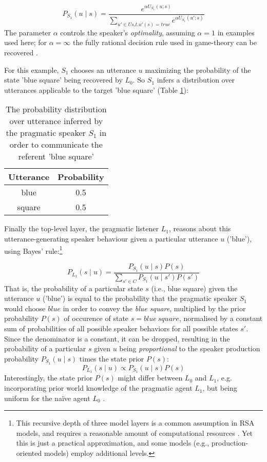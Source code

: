 $$P_{S_1}(u \mid s) = \frac{e^{\alpha U_{S_1} (u; s)}}{\sum_{u' \in U s.t. u'(s) = true} e^{\alpha U_{S_1} (u'; s)}}$$
The parameter $\alpha$ controls the speaker's \emph{optimality}, assuming $\alpha = 1$ in examples used here; for $\alpha = \infty $ the fully rational decision rule used in game-theory can be recovered \parencite{problang, lassiter2017adjectival}.

For this example, $S_1$ chooses an utterance $u$ maximizing the probability of the state 'blue square' being recovered by $L_0$. So $S_1$ infers a distribution over utterances applicable to the target 'blue square' (Table \ref{rsa-s1}):

\begin{table}[h]
	\begin{center}
		\caption{The probability distribution over utterance inferred by the pragmatic speaker $S_1$ in order to communicate the referent 'blue square'}
		\label{rsa-s1}
		\vskip 0.12in
		\begin{tabular}{cc}
			Utterance & Probability \\
			\hline
			blue & 0.5 \\
			square & 0.5
		\end{tabular}
	\end{center}
\end{table}
 
Finally the top-level layer, the pragmatic listener $L_1$, reasons about this utterance-generating speaker behaviour given a particular utterance $u$ ('blue'), using Bayes' rule:\footnote{This recursive depth of three model layers is a common assumption in RSA models, and requires a reasonable amount of computational resources \parencite{lassiter2017adjectival}. Yet this is just a practical approximation, and some models (e.g., production-oriented models) employ additional levels\parencite{problang}.}
 
$$P_{L_1}(s \mid u) = \frac{P_{S_1}(u \mid s) P(s)}{\sum_{s' \in C} P_{S_1}(u \mid s') P(s')}$$
That is, the probability of a particular state $s$ (i.e., blue square) given the utterance $u$ ('blue') is equal to the probability that the pragmatic speaker $S_1$ would choose $blue$ in order to convey the \textit{blue square}, multiplied by the prior probability $P(s)$ of occurence of state $s = blue \:square$, normalised by a constant sum of probabilities of all possible speaker behaviors for all possible states $s'$. Since the denominator is a constant, it can be dropped, resulting in the probability of a particular $s$ given $u$ being \emph{proportional} to the speaker production probability $P_{S_1}(u \mid s)$ times the state prior $P(s)$:
$$P_{L_1}(s \mid u) \propto P_{S_1}(u \mid s) P(s)$$ 
Interestingly, the state prior $P(s)$ might differ between $L_0$ and $L_1$, e.g. incorporating prior world knowledge of the pragmatic agent $L_1$, but being uniform for the na\"ive agent $L_0$ \parencite{problang}. 

